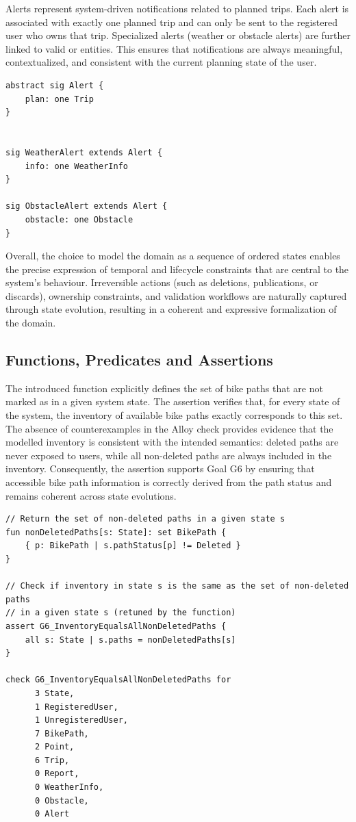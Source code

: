 Alerts represent system-driven notifications related to planned trips. Each alert is associated with exactly one planned trip and can only be sent to the registered user who owns that trip. Specialized alerts (weather or obstacle alerts) are further linked to valid  or  entities. This ensures that notifications are always meaningful, contextualized, and consistent with the current planning state of the user.

\begin{lstlisting}[caption=Alert Signature.]
abstract sig Alert {
    plan: one Trip
}


sig WeatherAlert extends Alert {
    info: one WeatherInfo
}

sig ObstacleAlert extends Alert {
    obstacle: one Obstacle
}
\end{lstlisting}

Overall, the choice to model the domain as a sequence of ordered states enables the precise expression of temporal and lifecycle constraints that are central to the system’s behaviour. Irreversible actions (such as deletions, publications, or discards), ownership constraints, and validation workflows are naturally captured through state evolution, resulting in a coherent and expressive formalization of the domain.

\subsection{Functions, Predicates and Assertions}
The introduced function  explicitly defines the set of bike paths that are not marked as  in a given system state. The assertion  verifies that, for every state of the system, the inventory of available bike paths exactly corresponds to this set. The absence of counterexamples in the Alloy check provides evidence that the modelled inventory is consistent with the intended semantics: deleted paths are never exposed to users, while all non-deleted paths are always included in the inventory. Consequently, the assertion supports Goal G6 by ensuring that accessible bike path information is correctly derived from the path status and remains coherent across state evolutions.

\begin{lstlisting}[caption=Assertion for Goal G6.]
// Return the set of non-deleted paths in a given state s
fun nonDeletedPaths[s: State]: set BikePath {
    { p: BikePath | s.pathStatus[p] != Deleted }
}

// Check if inventory in state s is the same as the set of non-deleted paths 
// in a given state s (retuned by the function)
assert G6_InventoryEqualsAllNonDeletedPaths {
    all s: State | s.paths = nonDeletedPaths[s]
}

check G6_InventoryEqualsAllNonDeletedPaths for
      3 State,
      1 RegisteredUser,
      1 UnregisteredUser,
      7 BikePath,
      2 Point,
      6 Trip,
      0 Report,
      0 WeatherInfo,
      0 Obstacle,
      0 Alert
\end{lstlisting}

